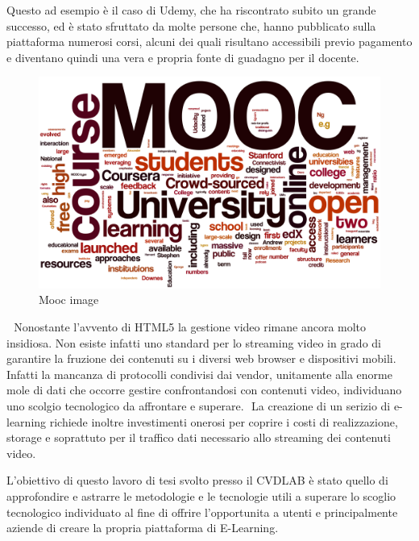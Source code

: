 Questo ad esempio è il caso di Udemy, che ha riscontrato subito un grande successo, ed è stato sfruttato da molte persone che, hanno pubblicato sulla piattaforma numerosi corsi, alcuni dei quali risultano accessibili previo pagamento e diventano quindi una vera e propria fonte di guadagno per il docente.
​
​
\begin{figure}[htb] %
 \centering
 \includegraphics[width=0.8\linewidth]{images/introduction/mooc.png}\hfill
 \caption[Mooc image]{Mooc image}
 \label{fig:fourV}
\end{figure}
​
​
Nonostante l'avvento di HTML5 la gestione video rimane ancora molto insidiosa. Non esiste infatti uno standard per lo streaming video in grado di garantire la fruzione dei contenuti su i diversi web browser e dispositivi mobili.
Infatti la mancanza di protocolli condivisi dai vendor, unitamente alla enorme mole di dati che occorre gestire confrontandosi con contenuti video, individuano uno scolgio tecnologico da affrontare e superare.
​
La creazione di un serizio di e-learning richiede inoltre investimenti onerosi per coprire i costi di realizzazione, storage e soprattuto per il traffico dati necessario allo streaming dei contenuti video.
​

L'obiettivo di questo lavoro di tesi svolto presso il CVDLAB è stato quello di approfondire e astrarre le metodologie e le tecnologie utili a superare lo scoglio tecnologico individuato al fine di offrire l'opportunita a utenti e principalmente aziende di creare la propria piattaforma di E-Learning.

